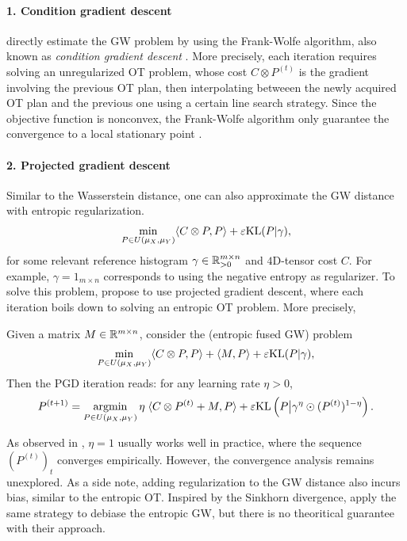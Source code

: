 \paragraph{1. Condition gradient descent} \citep{Vayer19b} directly estimate the GW problem by using
the Frank-Wolfe algorithm, also known as \textit{condition gradient descent}
\citep{Frank56,Jaggi13}. More precisely, each iteration requires
solving an unregularized OT problem, whose cost $C \otimes P^{(t)}$ is the gradient
involving the previous OT plan, then interpolating betweeen the newly acquired OT plan and
the previous one using a certain line search strategy. Since the objective function is nonconvex,
the Frank-Wolfe algorithm only guarantee the convergence to a local stationary point \citep{Julien16}.

\paragraph{2. Projected gradient descent} Similar to the Wasserstein distance,
one can also approximate the GW distance with entropic regularization.
\begin{align}
  \min_{\substack{P \in U(\mu_X, \mu_Y)}} \langle C \otimes P, P \rangle + \varepsilon \text{KL}(P | \gamma),
\end{align}
for some relevant reference histogram $\gamma \in \mathbb R^{m \times n}_{> 0}$ and $4$D-tensor cost $C$.
For example, $\gamma = 1_{m \times n}$ corresponds to using the negative entropy as regularizer.
To solve this problem, \citep{Peyre16,Solomon16} propose to use projected gradient descent,
where each iteration boils down to solving an entropic OT problem. More precisely,
\begin{lemma}
  \label{lemma:fgw_pgd}
  Given a matrix $M \in \mathbb R^{m \times n}$, consider the (entropic fused GW) problem
  \begin{align}
    \label{eq:fused_egw}
    \min_{\substack{P \in U(\mu_X, \mu_Y)}} \langle C \otimes P, P \rangle
    + \langle M, P \rangle + \varepsilon \text{KL}(P | \gamma),
  \end{align}
  Then the PGD iteration reads: for any learning rate $\eta > 0$,
  \begin{align}
    P^{(t+1)} = \operatorname*{argmin}_{P \in U(\mu_X, \mu_Y)}
    \eta \; \langle C \otimes P^{(t)} + M, P \rangle
    + \varepsilon \text{KL} \left( P \big| \gamma^{\eta} \odot (P^{(t)})^{1 - \eta} \right).
  \end{align}
\end{lemma}
As observed in \citep{Peyre19}, $\eta = 1$ usually works well in practice,
where the sequence $(P^{(t)})_t$ converges empirically. However, the convergence analysis remains
unexplored. As a side note, adding regularization to the GW distance also incurs bias,
similar to the entropic OT. Inspired by the Sinkhorn divergence,
\citep{Bunne19} apply the same strategy to debiase the entropic GW,
but there is no theoritical guarantee with their approach.

